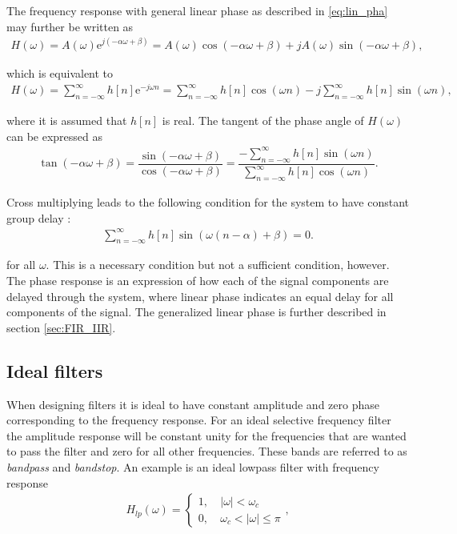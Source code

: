 The frequency response with general linear phase as described in \ref{eq:lin_pha} may further be written as
\begin{align*}
H(\omega) = A(\omega) \text{e}^{j(-\alpha\omega + \beta)} = A(\omega) \cos(-\alpha\omega + \beta) + j A(\omega) \sin(-\alpha\omega + \beta),
\end{align*}

which is equivalent to
\begin{align*}
H(\omega) = \sum_{n=-\infty}^\infty h[n] \text{e}^{-j \omega n} = \sum_{n=-\infty}^\infty h[n] \cos(\omega n) - j \sum_{n=-\infty}^\infty h[n] \sin(\omega n),
\end{align*}

where it is assumed that $h[n]$ is real. The tangent of the phase angle of $H(\omega)$ can be expressed as
\begin{align*}
\tan(-\alpha\omega + \beta) = \dfrac{\sin(-\alpha\omega + \beta)}{\cos(-\alpha\omega + \beta)} = \dfrac{- \sum_{n=-\infty}^\infty h[n] \sin(\omega n)}{\sum_{n=-\infty}^\infty h[n] \cos(\omega n)}.
\end{align*}

Cross multiplying leads to the following condition for the system to have constant group delay \cite{page 341, DTSP}:
\begin{align}\label{eq:cons_gro}
\sum_{n=-\infty}^{\infty}h[n]\sin\left(\omega \left(n-\alpha \right) + \beta \right) = 0.
\end{align}

for all $\omega$. This is a necessary condition but not a sufficient condition, however. The phase response is an expression of how each of the signal components are delayed through the system, where linear phase indicates an equal delay for all components of the signal. The generalized linear phase is further described in section \ref{sec:FIR_IIR}.

\subsection{Ideal filters} \label{sec:ideal_filt}
When designing filters it is ideal to have constant amplitude and zero phase corresponding to the frequency response. For an ideal selective frequency filter the amplitude response will be constant unity for the frequencies that are wanted to pass the filter and zero for all other frequencies. These bands are referred to as \textit{bandpass} and \textit{bandstop}. An example is an ideal lowpass filter with frequency response 
\begin{align} \label{eq:low}
H_{lp}(\omega) =
\left\{ \begin{matrix}
1, &\ \left| \omega \right|< \omega_c \\
0, &\ \omega_c < \left| \omega \right| \leq \pi
\end{matrix}\right.,
\end{align}
    
